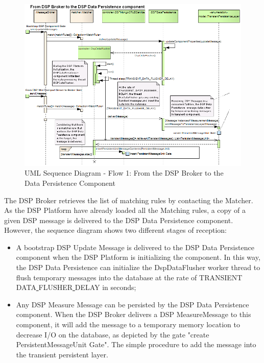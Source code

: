 \begin{figure}[!b]
  \centering
  \includegraphics[scale=0.5]{../diagrams/From-DSP-Broker-To-DSPDataPersistence-General-Sequence}
  \caption{UML Sequence Diagram - Flow 1: From the DSP Broker to the Data
  Persistence Component}
  \label{fig:From-DSP-Broker-To-DSPDataPersistence-General-Sequence}
\end{figure}

The DSP Broker retrieves the list of matching rules by contacting the Matcher.
As the DSP Platform have already loaded all the Matching rules, a copy of a
given DSP message is delivered to the DSP Data Persistence component. However,
the sequence diagram shows two different stages of reception:

\begin{itemize}
  \item A bootstrap DSP Update Message is delivered to the DSP Data Persistence
  component when the DSP Platform is initializing the component. In this way,
  the DSP Data Persistence can initialize the DspDataFlusher worker thread to
  flush temporary messages into the database at the rate of
  TRANSIENT\underline{ }DATA\underline{ }FLUSHER\underline{ }DELAY in seconds;
  \item Any DSP Measure Message can be persisted by the DSP Data Persistence
  component. When the DSP Broker delivers a DSP MeasureMessage to this
  component, it will add the message to a temporary memory location to decrease
  I/O on the database, as depicted by the gate "create PersistentMessageUnit
  Gate". The simple procedure to add the message into the transient persistent
  layer.
\end{itemize}

